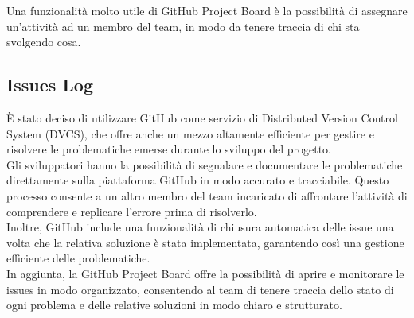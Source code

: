 Una funzionalità molto utile di GitHub Project Board è la possibilità di assegnare un'attività ad un membro del team, 
in modo da tenere traccia di chi sta svolgendo cosa.\\

\subsection{Issues Log}
È stato deciso di utilizzare GitHub come servizio di Distributed Version Control System (DVCS), che offre anche un mezzo altamente 
efficiente per gestire e risolvere le problematiche emerse durante lo sviluppo del progetto. \\

Gli sviluppatori hanno la possibilità di segnalare e documentare le problematiche direttamente sulla piattaforma GitHub in modo accurato 
e tracciabile. Questo processo consente a un altro membro del team incaricato di affrontare l'attività di comprendere e replicare 
l'errore prima di risolverlo.\\

Inoltre, GitHub include una funzionalità di chiusura automatica delle issue una volta che la relativa soluzione è stata implementata, 
garantendo così una gestione efficiente delle problematiche.\\

In aggiunta, la GitHub Project Board offre la possibilità di aprire e monitorare le issues in modo organizzato, consentendo al team di 
tenere traccia dello stato di ogni problema e delle relative soluzioni in modo chiaro e strutturato.

